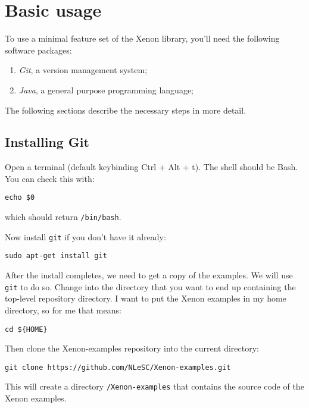 \chapter{Basic usage}

To use a minimal feature set of the Xenon library, you'll need the following software packages:
\begin{enumerate}
\item{\textit{Git}, a version management system;}
\item{\textit{Java}, a general purpose programming language;}
\end{enumerate}


The following sections describe the necessary steps in more detail.




\section{Installing Git}

Open a terminal (default keybinding Ctrl + Alt + t). The shell should be Bash. You can check this with:
\begin{lstlisting}[style=basic,style=bash]
echo $0
\end{lstlisting} %
which should return \texttt{/bin/bash}.


Now install \texttt{git} if you don't have it already:
\begin{lstlisting}[style=basic,style=bash]
sudo apt-get install git
\end{lstlisting}

After the install completes, we need to get a copy of the examples. We will use \texttt{git} to do so. Change into the directory that you want to end up containing the top-level repository directory. I want to put the Xenon examples in my home directory, so for me that means:
\begin{lstlisting}[style=basic,style=bash]
cd ${HOME}
\end{lstlisting} %

Then clone the Xenon-examples repository into the current directory:
\begin{lstlisting}[style=basic,style=bash]
git clone https://github.com/NLeSC/Xenon-examples.git
\end{lstlisting}
This will create a directory \texttt{\mytilde{}/Xenon-examples} that contains the source code of the Xenon examples.






